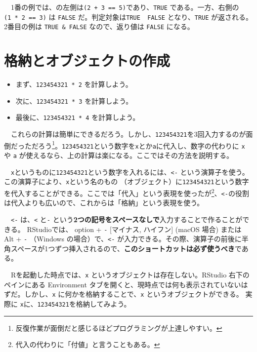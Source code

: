 \documentclass[
  a4paper,
  pandoc,
  ja=standard,
  jafont=haranoaji]{bxjsbook}
\providecommand{\tightlist}{%
  \setlength{\itemsep}{0pt}\setlength{\parskip}{0pt}}
\begin{document}
　1番の例では、\texttt{\textbar{}}の左側は\texttt{(2\ +\ 3\ ==\ 5)}であり、\texttt{TRUE}
である。一方、右側の\texttt{(1\ *\ 2\ ==\ 3)} は \texttt{FALSE}
だ。判定対象は\texttt{TRUE\ \textbar{}\ FALSE} となり、\texttt{TRUE}
が返される。 2番目の例は \texttt{TRUE\ \&\ FALSE} なので、返り値は
\texttt{FALSE} になる。

\hypertarget{sec-rbasic_input}{%
\section{格納とオブジェクトの作成}\label{sec-rbasic_input}}

\begin{itemize}
\tightlist
\item
  まず、\texttt{123454321\ *\ 2} を計算しよう。
\item
  次に、\texttt{123454321\ *\ 3} を計算しよう。
\item
  最後に、\texttt{123454321\ *\ 4} を計算しよう。
\end{itemize}

　これらの計算は簡単にできるだろう。しかし、\texttt{123454321}を3回入力するのが面倒だっただろう\footnote{反復作業が面倒だと感じるほどプログラミングが上達しやすい。}。\texttt{123454321}という数字を\texttt{x}とか\texttt{a}に代入し、数字の代わりに
\texttt{x} や \texttt{a}
が使えるなら、上の計算は楽になる。ここではその方法を説明する。

　\texttt{x}というものに\texttt{123454321}という数字を入れるには、\texttt{\textless{}-}
という演算子を使う。この演算子により、\texttt{x}という名のもの
（オブジェクト）に\texttt{123454321}という数字を代入することができる。ここでは「代入」という表現を使ったが\footnote{代入の代わりに「付値」と言うこともある。}、\texttt{\textless{}-}の役割は代入よりも広いので、これからは「格納」という表現を使う。

　\texttt{\textless{}-} は、\texttt{\textless{}} と\texttt{-}
という\textbf{2つの記号をスペースなしで}入力することで作ることができる。
RStudioでは、 option + \texttt{-} {[}マイナス, ハイフン{]} (macOS 場合)
または Alt + \texttt{-} （Windows の場合）で、\texttt{\textless{}-}
が入力できる。その際、演算子の前後に半角スペースが1つずつ挿入されるので、\textbf{このショートカットは必ず使うべき}である。

　Rを起動した時点では、\texttt{x}
というオブジェクトは存在しない。RStudio 右下のペインにある Environment
タブを開くと、現時点では何も表示されていないはずだ。しかし、\texttt{x}
に何かを格納することで、\texttt{x} というオブジェクトができる。 実際に
\texttt{x}に、\texttt{123454321}を格納してみよう。
\end{document}

